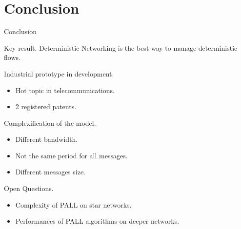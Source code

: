 \documentclass[10 pt]{beamer}
\begin{document}
\section{Conclusion}
\begin{frame}{Conclusion}


\begin{block}{Key result.}
  Deterministic Networking is the best way to manage deterministic flows.
\end{block}

\begin{block}{Industrial prototype in development.}
\begin{itemize}
    \item Hot topic in telecommunications.
    \item 2 registered patents.
      \end{itemize}
\end{block}
  
\begin{block}{Complexification of the model.}
  \begin{itemize}
      \item Different bandwidth.
      \item Not the same period for all messages.
      \item Different messages size.
    \end{itemize}
\end{block}

\begin{block}{Open Questions.}
  \begin{itemize}
      \item Complexity of PALL on star networks.
      \item Performances of PALL algorithms on deeper networks.
    \end{itemize}
\end{block}


\end{frame}
\end{document}
